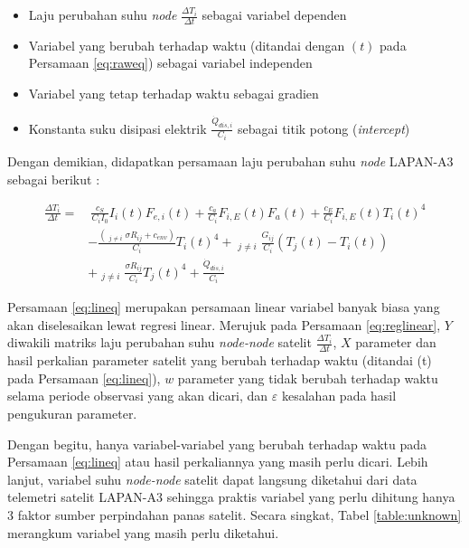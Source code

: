 \begin{itemize}
	\item Laju perubahan suhu \textit{node} $\frac{\Delta T_i}{\Delta t}$ sebagai variabel dependen
	\item Variabel yang berubah terhadap waktu (ditandai dengan $(t)$ pada Persamaan \ref{eq:raweq}) sebagai variabel independen
	\item Variabel yang tetap terhadap waktu sebagai gradien
	\item Konstanta suku disipasi elektrik $\frac{\dot{Q}_{dis,i}}{C_i}$ sebagai titik potong (\textit{intercept})
\end{itemize}

Dengan demikian, didapatkan persamaan laju perubahan suhu \textit{node} LAPAN-A3 sebagai berikut :

\begin{equation}
\label{eq:lineq}
\begin{split}
	\frac{\Delta T_i}{\Delta t} = &\ \frac{c_S}{C_i I_0} I_{i}(t) F_{e,i}(t) + \frac{c_a}{C_i} F_{i,E}(t) F_a(t) + \frac{c_E}{C_i} F_{i,E}(t) T_{i}(t)^4 \\
	&- \frac{\left( \mathop{\sum_{j=1}^{N}}_{j \neq i} \sigma R_{ij} + c_{env} \right) }{C_i} T_{i}(t)^4 + \mathop{\sum_{j=1}^{N}}_{j \neq i} \frac{G_{ij}}{C_i} \left(T_j(t) - T_i(t)\right) \\
	&+ \mathop{\sum_{j=1}^{N}}_{j \neq i} \frac{\sigma R_{ij}}{C_i}T_{j}(t)^4 + \frac{\dot{Q}_{dis,i}}{C_i}
\end{split}
\end{equation}

Persamaan \ref{eq:lineq} merupakan persamaan linear variabel banyak biasa yang
akan diselesaikan lewat regresi linear. Merujuk pada Persamaan
\ref{eq:reglinear}, $Y$ diwakili matriks laju perubahan suhu \textit{node-node}
satelit $\frac{\Delta T_i}{\Delta t}$, $X$ parameter dan hasil perkalian
parameter satelit yang berubah terhadap waktu (ditandai (t) pada Persamaan
\ref{eq:lineq}), $w$ parameter yang tidak berubah terhadap waktu selama periode
observasi yang akan dicari, dan $\varepsilon$ kesalahan pada hasil pengukuran parameter.  

Dengan begitu, hanya variabel-variabel yang berubah terhadap waktu pada
Persamaan \ref{eq:lineq} atau hasil perkaliannya yang masih perlu dicari.
Lebih lanjut, variabel suhu \textit{node-node} satelit dapat langsung
diketahui dari data telemetri satelit LAPAN-A3 sehingga praktis variabel yang
perlu dihitung hanya 3 faktor sumber perpindahan panas satelit. Secara singkat,
Tabel \ref{table:unknown} merangkum variabel yang masih perlu diketahui.


